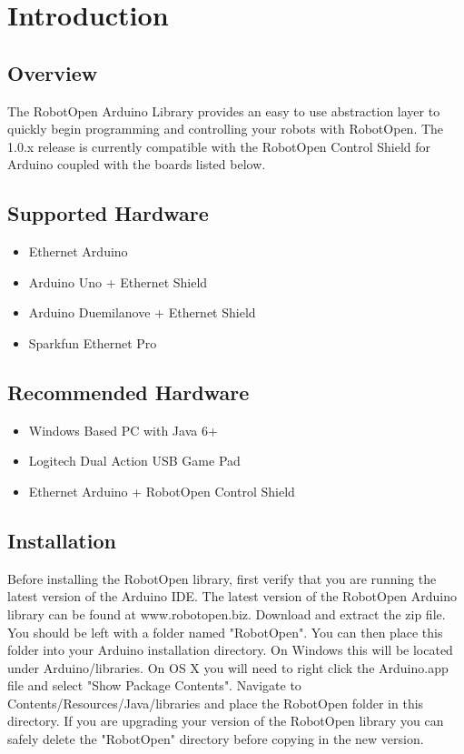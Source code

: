 \documentclass[11pt]{article} %
\begin{document}
\section*{}
\section{Introduction}

\subsection{Overview}
The RobotOpen Arduino Library provides an easy to use abstraction layer to quickly begin programming and controlling your robots with RobotOpen. The 1.0.x release is currently compatible with the RobotOpen Control Shield for Arduino coupled with the boards listed below. 

\subsection{Supported Hardware}

\begin{itemize}
\item Ethernet Arduino
\item Arduino Uno + Ethernet Shield
\item Arduino Duemilanove + Ethernet Shield
\item Sparkfun Ethernet Pro
\end{itemize}

\subsection{Recommended Hardware}
\begin{itemize}
\item Windows Based PC with Java 6+
\item Logitech Dual Action USB Game Pad
\item Ethernet Arduino + RobotOpen Control Shield
\end{itemize}

\subsection{Installation}
Before installing the RobotOpen library, first verify that you are running the latest version of the Arduino IDE. The latest version of the RobotOpen Arduino library can be found at www.robotopen.biz. Download and extract the zip file. You should be left with a folder named "RobotOpen". You can then place this folder into your Arduino installation directory. On Windows this will be located under Arduino/libraries. On OS X you will need to right click the Arduino.app file and select "Show Package Contents". Navigate to Contents/Resources/Java/libraries and place the RobotOpen folder in this directory. If you are upgrading your version of the RobotOpen library you can safely delete the "RobotOpen" directory before copying in the new version.
\end{document}
